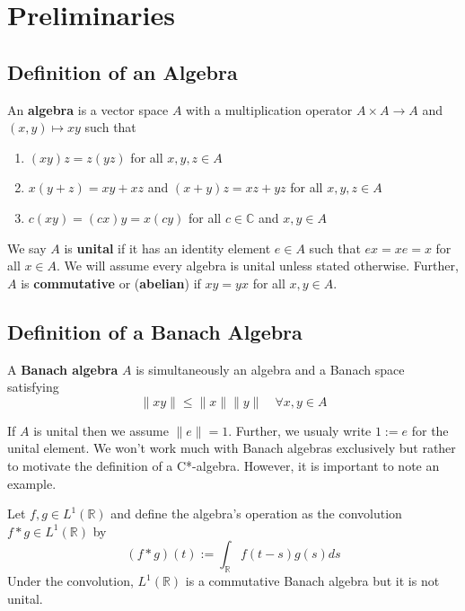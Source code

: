 \section{Preliminaries}
\label{sec:prelim}
\subsection{Definition of an Algebra}
\begin{definition}
    An \textbf{algebra} is a vector space $A$ with a multiplication operator
    $A \times A \to A$ and $(x,y) \mapsto xy$ such that
    \begin{enumerate}
        \item $(xy)z = z(yz)$ for all $x,y,z \in A$
        \item $x(y+z) = xy + xz$ and $(x+y)z = xz+yz$ for all $x,y,z \in A$
        \item $c(xy) = (cx)y = x(cy)$ for all $c \in \mathbb{C}$ and $x,y \in A$
    \end{enumerate}
\end{definition}
We say $A$ is \textbf{unital} if it has an identity element $e \in A$ such that
$ex = xe = x$ for all $x \in A$. We will assume every algebra is unital unless stated
otherwise. Further, $A$ is \textbf{commutative} or (\textbf{abelian})
if $xy=yx$ for all $x,y \in A$.

\subsection{Definition of a Banach Algebra}
\begin{definition}
    A \textbf{Banach algebra} $A$ is simultaneously an algebra and a Banach space satisfying
    \begin{equation*}
        \| xy \| \le \|x\| \|y\| \quad \forall x,y \in A
    \end{equation*}
\end{definition}
If $A$ is unital then we assume $\| e \| = 1$. Further, we usualy write $1:=e$ for
the unital element. We won't work much with Banach algebras exclusively but rather
to motivate the definition of a C*-algebra. However, it is important to note an example.
\begin{example}
    Let $f,g \in L^1(\mathbb{R})$ and define the algebra's operation as the convolution
    $f * g \in L^1 (\mathbb{R})$ by
    \begin{equation}
        (f * g)(t) := \int_{\mathbb{R}} f(t-s)g(s)ds
    \end{equation}
    Under the convolution, $L^1 (\mathbb{R})$ is a commutative Banach algebra but
    it is not unital.
\end{example}



